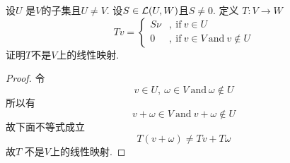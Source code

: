 \begin{problem}{10}
设$U$ 是$V$的子集且$U\neq V$.
设$S\in\mathcal{L}(U,W)$且$S\neq 0$.
定义 $T:V\rightarrow W$
\begin{equation}
	Tv=\left\{
	\begin{aligned}
		S\nu & , \ \mathrm{if}\ v\in U                         \\
		0    & ,\ \mathrm{if}\ v\in V\ \mathrm{and}\ v\notin U
	\end{aligned}
	\right.
\end{equation}
证明$T$不是$V$上的线性映射.
\end{problem}


\begin{proof}
	令
	$$v\in U,\ \omega\in V \ \mathrm{and} \ \omega \notin U $$
	所以有
	\begin{displaymath}
		v+\omega \in V\ \mathrm{and} \ v+\omega \notin U
	\end{displaymath}
	故下面不等式成立
	\begin{displaymath}
		T(v+\omega) \neq Tv+T\omega
	\end{displaymath}
	故$T$ 不是$V$上的线性映射.
\end{proof}
